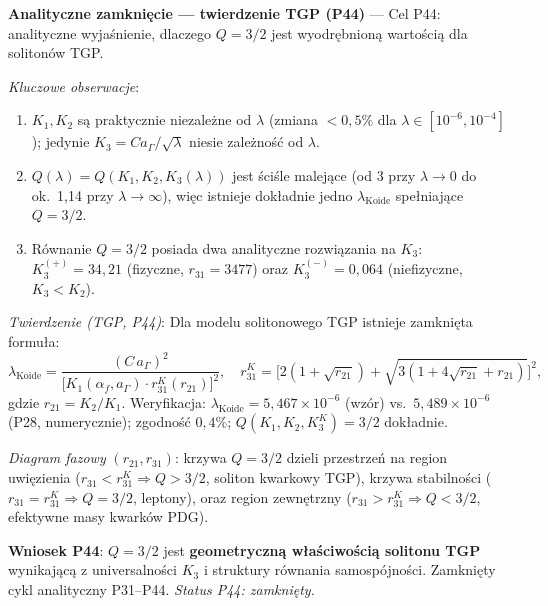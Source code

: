 \begin{problem}
\begin{description}[leftmargin=2em, labelindent=0pt]
  \textbf{Analityczne zamkni\k{e}cie — twierdzenie TGP (P44)} ---
  Cel P44: analityczne wyja\'snienie, dlaczego $Q = 3/2$ jest wyodr\k{e}bnion\k{a}
  warto\'sci\k{a} dla soliton\'ow TGP.
  \par
  \emph{Kluczowe obserwacje}:
  \begin{enumerate}[nosep]
    \item $K_1, K_2$ s\k{a} praktycznie niezale\.zne od $\lambda$
          (zmiana $<0{,}5\%$ dla $\lambda \in [10^{-6}, 10^{-4}]$);
          jedynie $K_3 = C a_\Gamma / \sqrt{\lambda}$ niesie zale\.zno\'s\'c od $\lambda$.
    \item $Q(\lambda) = Q(K_1, K_2, K_3(\lambda))$ jest \'sci\'sle malej\k{a}ce
          (od 3 przy $\lambda \to 0$ do ok.\ 1{,}14 przy $\lambda \to \infty$),
          wi\k{e}c istnieje dok\l{}adnie jedno $\lambda_\mathrm{Koide}$ spe\l{}niaj\k{a}ce
          $Q = 3/2$.
    \item R\'ownanie $Q = 3/2$ posiada dwa analityczne rozwi\k{a}zania na $K_3$:
          $K_3^{(+)} = 34{,}21$ (fizyczne, $r_{31} = 3477$) oraz
          $K_3^{(-)} = 0{,}064$ (niefizyczne, $K_3 < K_2$).
  \end{enumerate}
  \par
  \emph{Twierdzenie (TGP, P44)}: Dla modelu solitonowego TGP istnieje
  zamkni\k{e}ta formu\l{}a:
  \begin{equation}
    \lambda_\mathrm{Koide}
    = \frac{(C\,a_\Gamma)^2}{\bigl[K_1(\alpha_f, a_\Gamma)
      \cdot r_{31}^K(r_{21})\bigr]^2},
    \quad
    r_{31}^K
    = \bigl[2(1+\sqrt{r_{21}}) + \sqrt{3(1+4\sqrt{r_{21}}+r_{21})}\bigr]^2,
  \end{equation}
  gdzie $r_{21} = K_2/K_1$.
  Weryfikacja: $\lambda_\mathrm{Koide} = 5{,}467 \times 10^{-6}$
  (wz\'or) vs.\ $5{,}489 \times 10^{-6}$ (P28, numerycznie);
  zgodno\'s\'c $0{,}4\%$; $Q(K_1, K_2, K_3^K) = 3/2$ dok\l{}adnie.
  \par
  \emph{Diagram fazowy} $(r_{21}, r_{31})$:
  krzywa $Q = 3/2$ dzieli przestrze\'n na
  region uwi\k{e}zienia ($r_{31} < r_{31}^K \Rightarrow Q > 3/2$,
  soliton kwarkowy TGP),
  krzywa stabilno\'sci ($r_{31} = r_{31}^K \Rightarrow Q = 3/2$, leptony),
  oraz region zewn\k{e}trzny ($r_{31} > r_{31}^K \Rightarrow Q < 3/2$,
  efektywne masy kwark\'ow PDG).
  \par
  \textbf{Wniosek P44}: $Q = 3/2$ jest \textbf{geometryczn\k{a} w\l{}a\'sciwo\'sci\k{a}
  solitonu TGP} wynikaj\k{a}c\k{a} z universalno\'sci $K_3$ i struktury
  r\'ownania samosp\'ojno\'sci.
  Zamkni\k{e}ty cykl analityczny P31--P44.
  \textit{Status P44: zamkni\k{e}ty.}


\end{description}
\end{problem}
